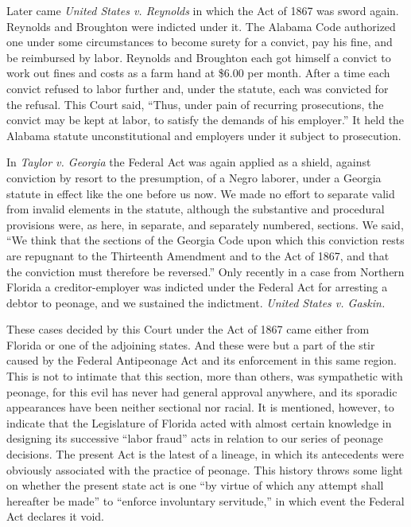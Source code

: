 \documentclass[
  letterpaper,
  11pt,
  DIV=9,
  openright]{scrbook}
\begin{document}
Later came \emph{United States v. Reynolds} in which the Act of 1867 was
sword again. Reynolds and Broughton were indicted under it. The Alabama
Code authorized one under some circumstances to become surety for a
convict, pay his fine, and be reimbursed by labor. Reynolds and
Broughton each got himself a convict to work out fines and costs as a
farm hand at \$6.00 per month. After a time each convict refused to
labor further and, under the statute, each was convicted for the
refusal. This Court said, ``Thus, under pain of recurring prosecutions,
the convict may be kept at labor, to satisfy the demands of his
employer.'' It held the Alabama statute unconstitutional and employers
under it subject to prosecution.

In \emph{Taylor v. Georgia} the Federal Act was again applied as a
shield, against conviction by resort to the presumption, of a Negro
laborer, under a Georgia statute in effect like the one before us now.
We made no effort to separate valid from invalid elements in the
statute, although the substantive and procedural provisions were, as
here, in separate, and separately numbered, sections. We said, ``We
think that the sections of the Georgia Code upon which this conviction
rests are repugnant to the Thirteenth Amendment and to the Act of 1867,
and that the conviction must therefore be reversed.'' Only recently in a
case from Northern Florida a creditor-employer was indicted under the
Federal Act for arresting a debtor to peonage, and we sustained the
indictment. \emph{United States v. Gaskin.}

These cases decided by this Court under the Act of 1867 came either from
Florida or one of the adjoining states. And these were but a part of the
stir caused by the Federal Antipeonage Act and its enforcement in this
same region. This is not to intimate that this section, more than
others, was sympathetic with peonage, for this evil has never had
general approval anywhere, and its sporadic appearances have been
neither sectional nor racial. It is mentioned, however, to indicate that
the Legislature of Florida acted with almost certain knowledge in
designing its successive ``labor fraud'' acts in relation to our series
of peonage decisions. The present Act is the latest of a lineage, in
which its antecedents were obviously associated with the practice of
peonage. This history throws some light on whether the present state act
is one ``by virtue of which any attempt shall hereafter be made'' to
``enforce involuntary servitude,'' in which event the Federal Act
declares it void.
\end{document}
